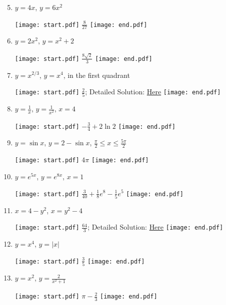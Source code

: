 \documentclass[12pt]{article}
\begin{document}
\begin{enumerate}
\setcounter{enumi}{4}

\item $y=4x$, $y=6x^2$

\texttt{[image: start.pdf]}
{{$\frac{8}{27}$}}
\texttt{[image: end.pdf]}


\item $y=2x^2$, $y=x^2+2$

\texttt{[image: start.pdf]}
{{$\frac{8\sqrt{2}}{3}$}}
\texttt{[image: end.pdf]}


\item $y=x^{2/3}$, $y=x^4$, in the first quadrant

\texttt{[image: start.pdf]}
{{$\frac{2}{5}$; Detailed Solution: \textcolor{blue}{\href{http://www.math.drexel.edu/classes/Calculus/resources/Math122HW/Solutions/122_07_Area_Between_Curves_07.pdf}{Here}}}}
\texttt{[image: end.pdf]}


\item $y=\frac{1}{x}$, $y=\frac{1}{x^2}$, $x=4$

\texttt{[image: start.pdf]}
{{$-\frac{3}{4}+2\ln{2}$}}
\texttt{[image: end.pdf]}


\item $y=\sin{x}$, $y=2-\sin{x}$, $\frac{\pi}{2}\leq x \leq \frac{5\pi}{2}$

\texttt{[image: start.pdf]}
{{$4\pi$}}
\texttt{[image: end.pdf]}


\item $y=e^{5x}$, $y=e^{8x}$, $x=1$

\texttt{[image: start.pdf]}
{{$\frac{3}{40}+\frac{1}{8}e^{8}-\frac{1}{5}e^5$}}
\texttt{[image: end.pdf]}


\item $x=4-y^2$, $x=y^2-4$

\texttt{[image: start.pdf]}
{{$\frac{64}{3}$; Detailed Solution: \textcolor{blue}{\href{http://www.math.drexel.edu/classes/Calculus/resources/Math122HW/Solutions/122_07_Area_Between_Curves_11.pdf}{Here}}}}
\texttt{[image: end.pdf]}


\item $y=x^4$, $y=|x|$

\texttt{[image: start.pdf]}
{{$\frac{3}{5}$}}
\texttt{[image: end.pdf]}


\item $y=x^2$, $y=\frac{2}{x^2+1}$

\texttt{[image: start.pdf]}
{{$\pi-\frac{2}{3}$}}
\texttt{[image: end.pdf]}


\newpage


\end{enumerate}
\end{document}
